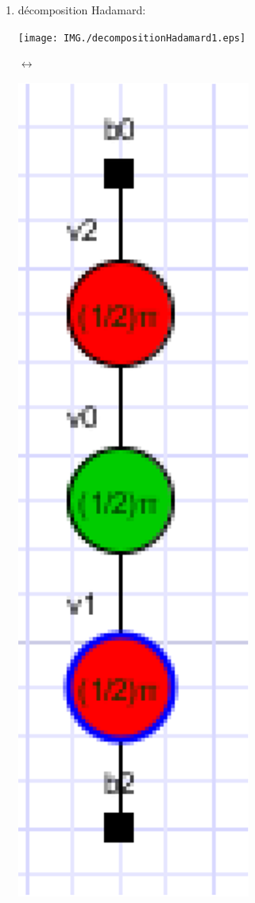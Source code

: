 \documentclass[a4paper,oneside]{book}
\begin{document}
\begin{enumerate}
\item décomposition Hadamard:\\
\begin{center}
\begin{minipage}[c]{0.25\textwidth}
\flushright\texttt{[image: IMG./decompositionHadamard1.eps]}
\end{minipage}
\hspace{0.5cm}\Huge{$\longleftrightarrow$}
\begin{minipage}[c]{0.25\textwidth}
\includegraphics[scale=0.3]{IMG/decompositionHadamard2-2.eps}
\end{minipage}
\label{decompositionHadamard}
\end{center}


\end{enumerate}
\end{document}
